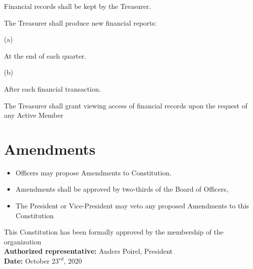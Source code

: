\documentclass{article}
\newcommand{\SubItem}[1]{
    {\setlength\itemindent{15pt} \item[] #1}
}
\begin{document}
\begin{itemize}
    \item[1.] Financial records shall be kept by the Treasurer.
    \item[2.] The Treasurer shall produce new financial reports:
        \SubItem{(a)} At the end of each quarter.
        \SubItem{(b)} After each financial transaction.   
    \item[3.] The Treasurer shall grant viewing access of financial records upon 
    the request of any Active Member   
\end{itemize}


\section{Amendments}

\begin{itemize}
    \item[1.] Officers may propose Amendments to Constitution. 
    \item[2.] Amendments shall be approved by two-thirds of the Board of Officers,
    \item[3.] The President or Vice-President may veto any proposed Amendments to this 
    Constitution 
\end{itemize}

\newpage

\begin{center}
    This Constitution has been formally approved by the membership of the organization \\
    \vspace{10pt}
    \textbf{Authorized representative:} Anders Poirel, President \\
    \vspace{10pt}
    \textbf{Date:} October $23^{rd}$, 2020
\end{center}
\end{document}
